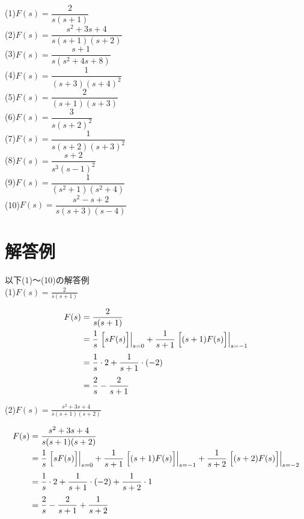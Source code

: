 \documentclass[a4paper,12pt]{report}
\begin{document}
  (1)\quad \( F(s) = \dfrac{2}{s(s+1)} \) \\

  (2)\quad \( F(s) = \dfrac{s^2 + 3s + 4}{s(s+1)(s+2)} \)\\

  (3)\quad \( F(s) = \dfrac{s+1}{s(s^2 + 4s + 8)} \) \\

  (4)\quad \( F(s) = \dfrac{1}{(s+3)(s+4)^2} \) \\

  (5)\quad \( F(s) = \dfrac{2}{(s+1)(s+3)} \) \\

  (6)\quad \( F(s) = \dfrac{3}{s(s+2)^2} \) \\

  (7)\quad \( F(s) = \dfrac{1}{s(s+2)(s+3)^2} \) \\

  (8)\quad \( F(s) = \dfrac{s+2}{s^3(s-1)^2} \) \\

  (9)\quad \( F(s) = \dfrac{1}{(s^2+1)(s^2+4)} \)\\
  
  (10)\quad \( F(s) = \dfrac{s^2 - s + 2}{s(s+3)(s-4)} \)


\chapter{解答例}

以下(1)～(10)の解答例\\

  (1)\quad \( F(s) = \frac{2}{s(s+1)} \) 

  \begin{align*}
    F(s) &= \frac{2}{s(s+1)} \\
          &= \frac{1}{s}\left.\Bigl[sF(s)\Bigr]\right|_{s=0} 
          + \frac{1}{s+1}\left.\Bigl[(s+1)F(s)\Bigr]\right|_{s=-1} \\[1mm]
          &= \frac{1}{s}\cdot 2 
          + \frac{1}{s+1}\cdot (-2) \\[1mm]
          &= \frac{2}{s} - \frac{2}{s+1}
  \end{align*} 

  (2)\quad \( F(s) = \frac{s^2 + 3s + 4}{s(s+1)(s+2)} \)
  
  \begin{align*}
    F(s) &= \frac{s^2 + 3s + 4}{s(s+1)(s+2)} \\
          &= \frac{1}{s}\left.\Bigl[sF(s)\Bigr]\right|_{s=0}
          + \frac{1}{s+1}\left.\Bigl[(s+1)F(s)\Bigr]\right|_{s=-1}
          + \frac{1}{s+2}\left.\Bigl[(s+2)F(s)\Bigr]\right|_{s=-2} \\[1mm]
          &= \frac{1}{s}\cdot 2
          + \frac{1}{s+1}\cdot (-2)
          + \frac{1}{s+2}\cdot 1 \\[1mm]
          &= \frac{2}{s} - \frac{2}{s+1} + \frac{1}{s+2}
  \end{align*}
\end{document}
